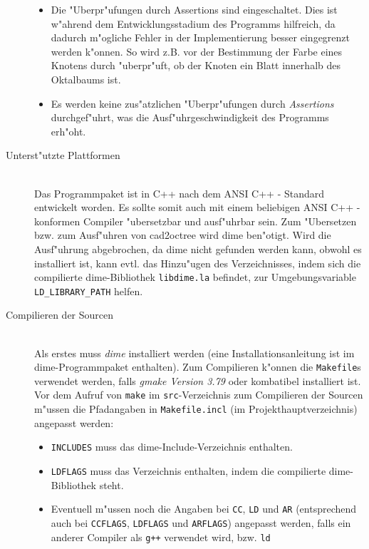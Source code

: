 \begin{description}
    \begin{itemize}
    \item\optoff Die "Uberpr"ufungen durch Assertions sind eingeschaltet. Dies 
	ist w"ahrend dem Entwicklungsstadium des Programms hilfreich, da 
	dadurch m"ogliche Fehler in der Implementierung besser eingegrenzt
	werden k"onnen. 
	So wird z.B. vor der Bestimmung der Farbe eines Knotens durch 
	 "uberpr"uft, ob der Knoten ein Blatt innerhalb 
	des Oktalbaums ist. 
    \item\opton Es werden keine zus"atzlichen "Uberpr"ufungen durch 
	\emph{Assertions} durchgef"uhrt, 
	was die Ausf"uhrgeschwindigkeit des Programms erh"oht. 
    \end{itemize}
\item[Unterst"utzte Plattformen]~\\ 
    Das Programmpaket ist in C++ nach dem ANSI C++ - Standard entwickelt 
    worden. Es sollte somit auch mit einem beliebigen ANSI C++ - konformen 
    Compiler "ubersetzbar und ausf"uhrbar sein. Zum "Ubersetzen bzw. zum 
    Ausf"uhren von cad2octree wird dime ben"otigt. 
    Wird die Ausf"uhrung abgebrochen, da dime nicht gefunden werden kann, 
    obwohl es installiert ist, kann evtl. das Hinzu"ugen des 
    Verzeichnisses, indem sich die compilierte dime-Bibliothek 
    \texttt{libdime.la} befindet, zur Umgebungsvariable 
    \texttt{LD\_LIBRARY\_PATH} helfen. 
\item[Compilieren der Sourcen]~\\
    Als erstes muss \emph{dime} installiert werden (eine 
    Installationsanleitung ist im dime-Programmpaket enthalten). 
    Zum Compilieren k"onnen die \texttt{Makefile}s verwendet werden, falls 
    \emph{gmake Version 3.79} oder kombatibel installiert ist. 
    Vor dem Aufruf von \texttt{make} im \texttt{src}-Verzeichnis zum 
    Compilieren der Sourcen m"ussen die Pfadangaben in \texttt{Makefile.incl} 
    (im Projekthauptverzeichnis) angepasst werden:
    \begin{itemize}
    \item \texttt{INCLUDES} muss das dime-Include-Verzeichnis enthalten. 
    \item \texttt{LDFLAGS} muss das Verzeichnis enthalten, indem die 
	compilierte dime-Bibliothek steht. 
    \item Eventuell m"ussen noch die Angaben bei \texttt{CC}, \texttt{LD} 
	und \texttt{AR} (entsprechend auch bei \texttt{CCFLAGS}, 
	\texttt{LDFLAGS} und \texttt{ARFLAGS}) angepasst werden, falls ein 
	anderer Compiler als \texttt{g++} verwendet wird, bzw. \texttt{ld} 

\end{itemize}
\end{description}
